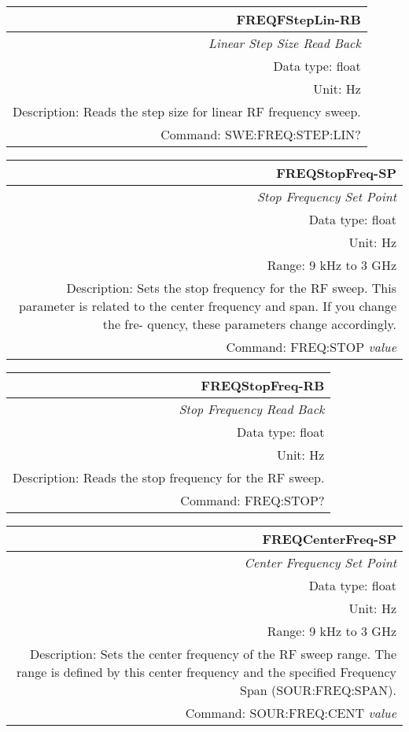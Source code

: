 \documentclass[openany]{article}
\begin{document}
		\begin{tabular}{N}
			\hline
			\bfseries FREQFStepLin-RB \\ \hline
			\emph{Linear Step Size Read Back} \\
			Data type: float \\
			Unit: Hz \\
			Description: Reads the step size for linear RF frequency sweep. \\
			Command: SWE:FREQ:STEP:LIN? \\

		\end{tabular}
%
		\begin{tabular}{N}
			\hline
			\bfseries FREQStopFreq-SP \\ \hline
			\emph{Stop Frequency Set Point} \\
			Data type: float \\
			Unit: Hz \\
			Range: 9 kHz to 3 GHz \\
			Description: Sets the stop frequency for the RF sweep.
This parameter is related to the center frequency and span. If you change the fre-
quency, these parameters change accordingly. \\
			Command: FREQ:STOP \emph{value} \\
			
		\end{tabular}


		\begin{tabular}{N}
			\hline
			\bfseries FREQStopFreq-RB \\ \hline
			\emph{Stop Frequency Read Back} \\
			Data type: float \\
			Unit: Hz \\
			Description: Reads the stop frequency for the RF sweep. \\
			Command: FREQ:STOP? \\

		\end{tabular}
%
		\begin{tabular}{N}
			\hline
			\bfseries FREQCenterFreq-SP \\ \hline
			\emph{Center Frequency Set Point} \\
			Data type: float \\
			Unit: Hz \\
			Range: 9 kHz to 3 GHz \\
			Description: Sets the center frequency of the RF sweep range. The range is defined by this center frequency and the specified Frequency Span (SOUR:FREQ:SPAN). \\
			Command: SOUR:FREQ:CENT \emph{value} \\
			
		\end{tabular}
\end{document}
